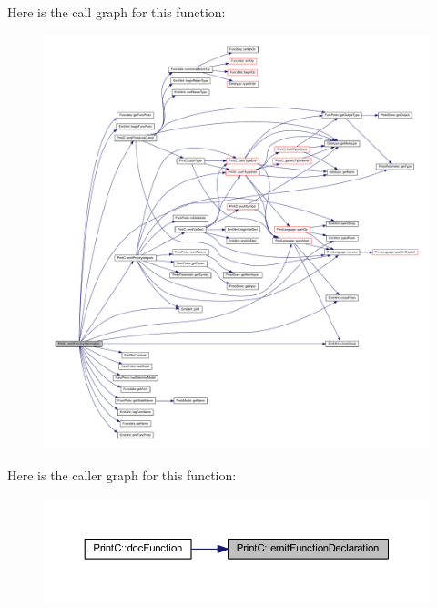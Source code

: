 Here is the call graph for this function\+:
\nopagebreak
\begin{figure}[H]
\begin{center}
\leavevmode
\includegraphics[width=350pt]{class_print_c_a38f45bf42a0b28ed731eb036636d0a11_cgraph}
\end{center}
\end{figure}
Here is the caller graph for this function\+:
\nopagebreak
\begin{figure}[H]
\begin{center}
\leavevmode
\includegraphics[width=350pt]{class_print_c_a38f45bf42a0b28ed731eb036636d0a11_icgraph}
\end{center}
\end{figure}
\mbox{\label{class_print_c_a7d048e59d4632ce57b87398378a6538c}} 
